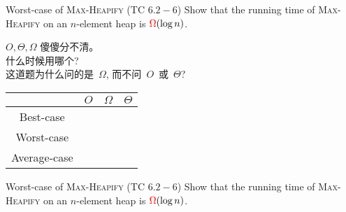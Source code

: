 
\begin{frame}{}
  \begin{exampleblock}{Worst-case of \textsc{Max-Heapify} (TC $6.2-6$)}
    Show that the  running time of \textsc{Max-Heapify} on an $n$-element heap is $\textcolor{red}{\Omega}(\log n)$.
  \end{exampleblock}
\end{frame}

\begin{frame}{}
  \begin{CJK*}{UTF8}{gbsn}
    \begin{center}
      { $O, \Theta, \Omega$ 傻傻分不清。\\[8pt]
      什么时候用哪个? \\[8pt]
      这道题为什么问的是~$\Omega$, 而不问~$O$~或~$\Theta$?}
    \end{center}
  \end{CJK*}
\end{frame}

\begin{frame}{}
  \begin{center}
    \begin{tabular}{c||c|c|c}
      \hline
		  & $O$ 	& $\Omega$ 	& $\Theta$ \\ \hline \hline
      Best-case 	& 	& 		&	   \\ \hline
      Worst-case 	& 	& 		&	   \\ \hline
      Average-case 	& 	& 		&	   \\ \hline
    \end{tabular}
  \end{center}
\end{frame}

\begin{frame}{}
  \begin{exampleblock}{Worst-case of \textsc{Max-Heapify} (TC $6.2-6$)}
    Show that the  running time of \textsc{Max-Heapify} on an $n$-element heap is $\textcolor{red}{\Omega}(\log n)$.
  \end{exampleblock}

  \pause
  \vspace{0.50cm}
  \centerline{}
\end{frame}

